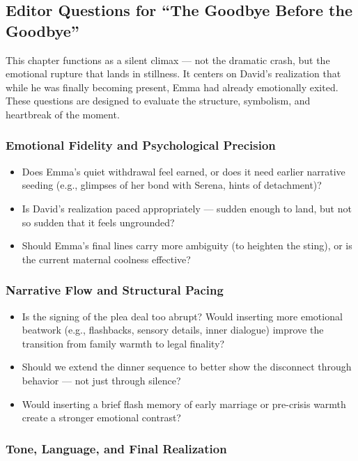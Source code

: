 \subsection*{Editor Questions for ``The Goodbye Before the Goodbye''}

This chapter functions as a silent climax — not the dramatic crash, but the emotional rupture that lands in stillness. It centers on David’s realization that while he was finally becoming present, Emma had already emotionally exited. These questions are designed to evaluate the structure, symbolism, and heartbreak of the moment.

\subsubsection*{Emotional Fidelity and Psychological Precision}

\begin{itemize}
  \item Does Emma’s quiet withdrawal feel earned, or does it need earlier narrative seeding (e.g., glimpses of her bond with Serena, hints of detachment)?
  \item Is David’s realization paced appropriately — sudden enough to land, but not so sudden that it feels ungrounded?
  \item Should Emma’s final lines carry more ambiguity (to heighten the sting), or is the current maternal coolness effective?
\end{itemize}

\subsubsection*{Narrative Flow and Structural Pacing}

\begin{itemize}
  \item Is the signing of the plea deal too abrupt? Would inserting more emotional beatwork (e.g., flashbacks, sensory details, inner dialogue) improve the transition from family warmth to legal finality?
  \item Should we extend the dinner sequence to better show the disconnect through behavior — not just through silence?
  \item Would inserting a brief flash memory of early marriage or pre-crisis warmth create a stronger emotional contrast?
\end{itemize}

\subsubsection*{Tone, Language, and Final Realization}

